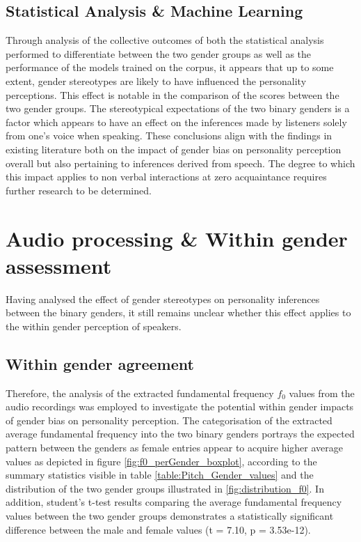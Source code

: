 \documentclass{l4proj}
\begin{document}
\subsection{Statistical Analysis \& Machine Learning}

Through analysis of the collective outcomes of both the statistical analysis performed to differentiate between the two gender groups as well as the performance of the models trained on the corpus, it appears that up to some extent, gender stereotypes are likely to have influenced the personality perceptions. This effect is notable in the comparison of the scores between the two gender groups. The stereotypical expectations of the two binary genders is a factor which appears to have an effect on the inferences made by listeners solely from one’s voice when speaking. These conclusions align with the findings in existing literature both on the impact of gender bias on personality perception overall but also pertaining to inferences derived from speech. The degree to which this impact applies to non verbal interactions at zero acquaintance requires further research to be determined.

\section{Audio processing  \& Within gender assessment}

Having analysed the effect of gender stereotypes on personality inferences between the binary genders, it still remains unclear whether this effect applies to the within gender perception of speakers. 

\subsection{Within gender agreement}
Therefore, the analysis of the extracted fundamental frequency $f_0$ values from the audio recordings was employed to investigate the potential within gender impacts of gender bias on personality perception.  
The categorisation of the extracted average fundamental frequency into the two binary genders portrays the expected pattern between the genders as female entries appear to acquire higher average values as depicted in figure \ref{fig:f0_perGender_boxplot}, according to the summary statistics visible in table \ref{table:Pitch_Gender_values} and the distribution of the two gender groups illustrated in \ref{fig:distribution_f0}. In addition, student’s t-test results comparing the average fundamental frequency values between the two gender groups demonstrates a statistically significant difference between the male and female values (t = 7.10, p =  3.53e-12).
\end{document}
